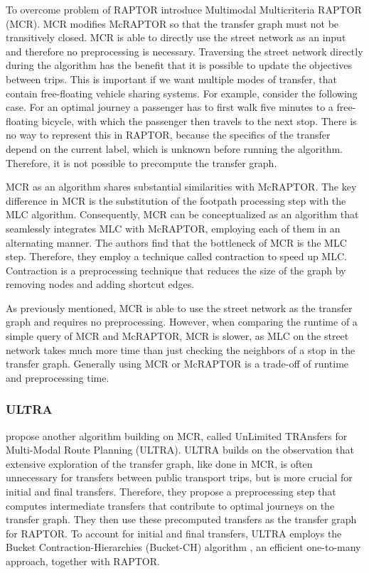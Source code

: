 To overcome problem of RAPTOR  introduce Multimodal Multicriteria RAPTOR (MCR).
MCR modifies McRAPTOR so that the transfer graph must not be transitively closed.
MCR is able to directly use the street network as an input and therefore no preprocessing is necessary.
Traversing the street network directly during the algorithm has the benefit that it is possible to update the objectives between trips.
This is important if we want multiple modes of transfer, that contain free-floating vehicle sharing systems.
For example, consider the following case.
For an optimal journey a passenger has to first walk five minutes to a free-floating bicycle, with which the passenger then travels to the next stop.
There is no way to represent this in RAPTOR, because the specifics of the transfer depend on the current label, which is unknown before running the algorithm.
Therefore, it is not possible to precompute the transfer graph.

MCR as an algorithm shares substantial similarities with McRAPTOR.
The key difference in MCR is the substitution of the footpath processing step with the MLC algorithm.
Consequently, MCR can be conceptualized as an algorithm that seamlessly integrates MLC with McRAPTOR, employing each of them in an alternating manner.
The authors find that the bottleneck of MCR is the MLC step.
Therefore, they employ a technique called contraction  to speed up MLC.
Contraction is a preprocessing technique that reduces the size of the graph by removing nodes and adding shortcut edges.

As previously mentioned, MCR is able to use the street network as the transfer graph and requires no preprocessing.
However, when comparing the runtime of a simple query of MCR and McRAPTOR, MCR is slower, as MLC on the street network takes much more time than just checking the neighbors of a stop in the transfer graph.
Generally using MCR or McRAPTOR is a trade-off of runtime and preprocessing time.


\subsubsection{ULTRA}
\label{subsubsec:ultra}

 propose another algorithm building on MCR, called UnLimited TRAnsfers for Multi-Modal Route Planning (ULTRA).
ULTRA builds on the observation that extensive exploration of the transfer graph, like done in MCR, is often unnecessary for transfers between public transport trips, but is more crucial for initial and final transfers.
Therefore, they propose a preprocessing step that computes intermediate transfers that contribute to optimal journeys on the transfer graph.
They then use these precomputed transfers as the transfer graph for RAPTOR.
To account for initial and final transfers, ULTRA employs the Bucket Contraction-Hierarchies (Bucket-CH) algorithm , an efficient one-to-many approach, together with RAPTOR.

